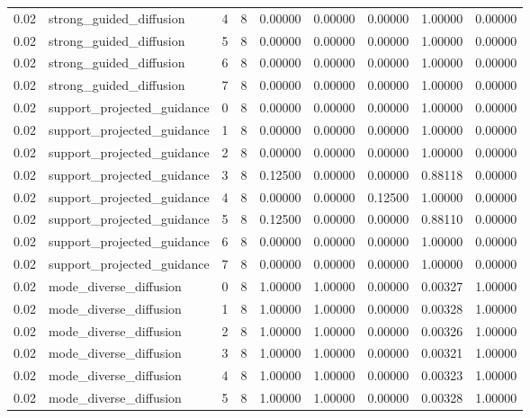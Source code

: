 \documentclass{article}
\begin{document}
\begin{table}[tbp]
{\begin{tabular}{lllllllll}
0.02 & strong\_guided\_diffusion & 4 & 8 & 0.00000 & 0.00000 & 0.00000 & 1.00000 & 0.00000 \\
0.02 & strong\_guided\_diffusion & 5 & 8 & 0.00000 & 0.00000 & 0.00000 & 1.00000 & 0.00000 \\
0.02 & strong\_guided\_diffusion & 6 & 8 & 0.00000 & 0.00000 & 0.00000 & 1.00000 & 0.00000 \\
0.02 & strong\_guided\_diffusion & 7 & 8 & 0.00000 & 0.00000 & 0.00000 & 1.00000 & 0.00000 \\
0.02 & support\_projected\_guidance & 0 & 8 & 0.00000 & 0.00000 & 0.00000 & 1.00000 & 0.00000 \\
0.02 & support\_projected\_guidance & 1 & 8 & 0.00000 & 0.00000 & 0.00000 & 1.00000 & 0.00000 \\
0.02 & support\_projected\_guidance & 2 & 8 & 0.00000 & 0.00000 & 0.00000 & 1.00000 & 0.00000 \\
0.02 & support\_projected\_guidance & 3 & 8 & 0.12500 & 0.00000 & 0.00000 & 0.88118 & 0.00000 \\
0.02 & support\_projected\_guidance & 4 & 8 & 0.00000 & 0.00000 & 0.12500 & 1.00000 & 0.00000 \\
0.02 & support\_projected\_guidance & 5 & 8 & 0.12500 & 0.00000 & 0.00000 & 0.88110 & 0.00000 \\
0.02 & support\_projected\_guidance & 6 & 8 & 0.00000 & 0.00000 & 0.00000 & 1.00000 & 0.00000 \\
0.02 & support\_projected\_guidance & 7 & 8 & 0.00000 & 0.00000 & 0.00000 & 1.00000 & 0.00000 \\
0.02 & mode\_diverse\_diffusion & 0 & 8 & 1.00000 & 1.00000 & 0.00000 & 0.00327 & 1.00000 \\
0.02 & mode\_diverse\_diffusion & 1 & 8 & 1.00000 & 1.00000 & 0.00000 & 0.00328 & 1.00000 \\
0.02 & mode\_diverse\_diffusion & 2 & 8 & 1.00000 & 1.00000 & 0.00000 & 0.00326 & 1.00000 \\
0.02 & mode\_diverse\_diffusion & 3 & 8 & 1.00000 & 1.00000 & 0.00000 & 0.00321 & 1.00000 \\
0.02 & mode\_diverse\_diffusion & 4 & 8 & 1.00000 & 1.00000 & 0.00000 & 0.00323 & 1.00000 \\
0.02 & mode\_diverse\_diffusion & 5 & 8 & 1.00000 & 1.00000 & 0.00000 & 0.00328 & 1.00000 \\
\bottomrule
\end{tabular}
}
\end{table}

\clearpage
\end{document}
